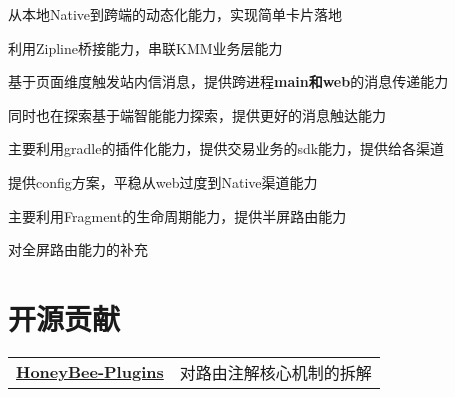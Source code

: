 \documentclass[]{deedy-resume-openfont}
\begin{document}
\begin{minipage}[t]{0.73\textwidth}
\vspace{0.2em}
\begin{tightemize}
    \item 从本地Native到跨端的动态化能力，实现简单卡片落地
    \item 利用Zipline桥接能力，串联KMM业务层能力
    \end{tightemize}
\sectionsep

\vspace{0.2em}
\begin{tightemize}
    \item 基于页面维度触发站内信消息，提供跨进程\textbf{main和web}的消息传递能力
    \item 同时也在探索基于端智能能力探索，提供更好的消息触达能力
    \end{tightemize}
\sectionsep

\vspace{0.2em}
\begin{tightemize}
    \item 主要利用gradle的插件化能力，提供交易业务的sdk能力，提供给各渠道
    \item 提供config方案，平稳从web过度到Native渠道能力
    \end{tightemize}
\sectionsep

\vspace{0.2em}
\begin{tightemize}
    \item 主要利用Fragment的生命周期能力，提供半屏路由能力
    \item 对全屏路由能力的补充
    \end{tightemize}
\sectionsep



\section{开源贡献}
\begin{tabular}{ll}
\href{https://github.com/Catheryan/HoneyBee-Plugins}{\bf HoneyBee-Plugins} & 对路由注解核心机制的拆解 \\
\end{tabular}
\sectionsep


\end{minipage}
\end{document}
